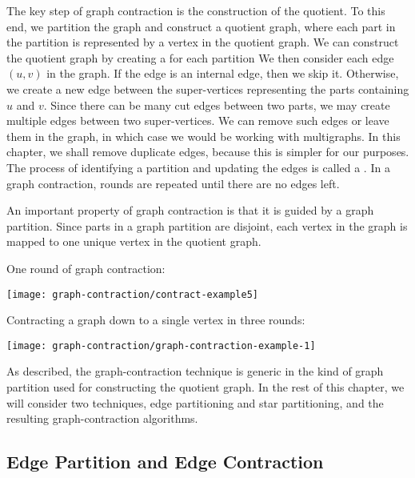 {The key step of graph contraction is the construction of the quotient.
%
To this end, we partition the graph and construct a quotient
graph, where each part in the partition is represented by a
vertex in the quotient graph.
%
We can construct the quotient graph by creating a
 for each partition
%
We then consider each edge $(u,v)$ in the graph.  If the edge is an internal
edge, then we skip it.
%
Otherwise,  we create a new edge between the
super-vertices representing the parts containing $u$ and $v$.
%
Since there can be many
cut edges between two parts, we may create multiple edges between
two super-vertices.  We can remove such edges or leave them in the graph, in
which case we would be working with multigraphs.  In this chapter, we
shall remove duplicate edges, because this is simpler for our
purposes.
%
The process of identifying a partition and updating the edges is
called a . 
%
In a graph contraction, rounds are repeated until there are no edges
left.


An important property of graph contraction is that it is guided by a graph partition.  Since parts in a graph partition are disjoint, each vertex in the graph is mapped to one unique vertex in the quotient graph.

\begin{example}
\label{ex:gc::contract-example}

One round of graph contraction:
\begin{center}
  \texttt{[image: graph-contraction/contract-example5]}
\end{center}

Contracting a graph down to a single vertex in three rounds:
\begin{center}
\texttt{[image: graph-contraction/graph-contraction-example-1]}
\end{center}
\end{example}

As described, the graph-contraction technique is generic in the kind
of graph partition used for constructing the quotient graph.  In the
rest of this chapter, we will consider two techniques, edge
partitioning and star partitioning, and the resulting
graph-contraction algorithms.


\subsection{Edge Partition and Edge Contraction}
\label{sec:gc::edge-partition}

}
